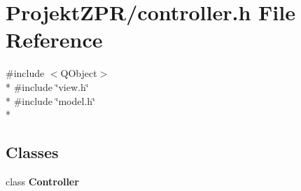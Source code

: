 \section{Projekt\-Z\-P\-R/controller.h File Reference}
\label{controller_8h}
{\ttfamily \#include $<$Q\-Object$>$}\\*
{\ttfamily \#include \char`\"{}view.\-h\char`\"{}}\\*
{\ttfamily \#include \char`\"{}model.\-h\char`\"{}}\\*
\subsection*{Classes}
\begin{DoxyCompactItemize}
\item 
class {\bf Controller}
\end{DoxyCompactItemize}
